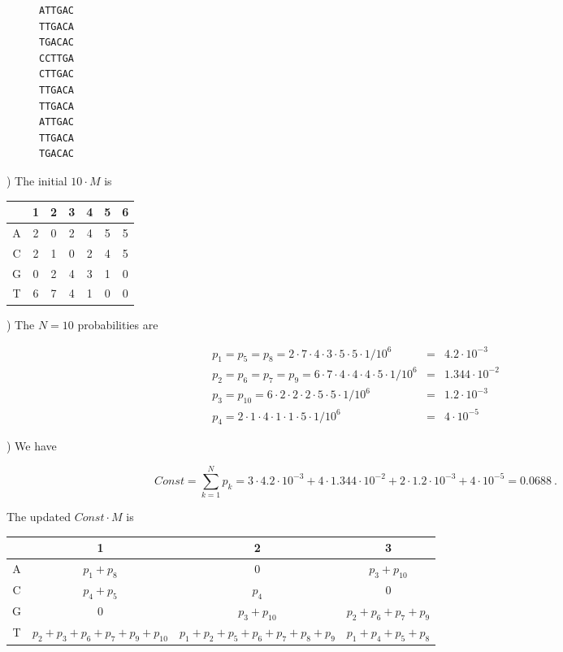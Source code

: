 \documentclass[a4paper,11pt]{article}
\begin{document}
\begin{figure}[h!]
\centering
\begin{BVerbatim}
ATTGAC
TTGACA
TGACAC
CCTTGA
CTTGAC
TTGACA
TTGACA
ATTGAC
TTGACA
TGACAC
\end{BVerbatim}
\end{figure}

\newpage
{}) The initial $10 \cdot M$ is

\begin{table}[h!]
\begin{center}
\begin{tabular}{|c|c|c|c|c|c|c|}
\hline
 & 1 & 2 & 3 & 4 & 5 & 6\\
\hline
A & 2 & 0 & 2 & 4 & 5 & 5\\
\hline
C & 2 & 1 & 0 & 2 & 4 & 5\\
\hline
G & 0 & 2 & 4 & 3 & 1 & 0\\
\hline
T & 6 & 7 & 4 & 1 & 0 & 0\\
 \hline
\end{tabular}
\end{center}
\end{table}

) The $N=10$ probabilities are 

\begin{eqnarray*}
p_1 = p_5 = p_8 = 2 \cdot 7 \cdot 4 \cdot 3 \cdot 5 \cdot 5 \cdot 1/10^6 &=& 4.2 \cdot 10^{-3}\\
p_2 = p_6 = p_7 = p_9 = 6 \cdot 7 \cdot 4 \cdot 4 \cdot 4 \cdot 5 \cdot 1/10^6 &=& 1.344 \cdot 10^{-2}\\
p_3 = p_{10} = 6 \cdot 2 \cdot 2 \cdot 2 \cdot 5 \cdot 5 \cdot 1/10^6 &=& 1.2 \cdot10^{-3}\\
p_4 = 2 \cdot 1 \cdot 4 \cdot 1 \cdot 1 \cdot 5 \cdot 1/10^6 &=& 4 \cdot 10^{-5}
\end{eqnarray*}

) We have 

$$
Const = \sum_{k=1}^N p_k = 3 \cdot 4.2 \cdot 10^{-3} + 4 \cdot 1.344 \cdot 10^{-2} + 2 \cdot 1.2 \cdot10^{-3} + 4 \cdot 10^{-5} = 0.0688~.
$$ 

\noindent The updated $Const \cdot M$ is

\begin{table}[h!]
\begin{center}
\begin{tabular}{|c|c|c|c|}
\hline
 & 1 & 2 & 3 \\
\hline
A & $p_1 + p_8$ & 0 & $p_3 + p_{10}$ \\
\hline
C & $p_4 + p_5$ & $p_4$ & 0  \\
\hline
G & 0 & $p_3 + p_{10}$ & $p_2 + p_6 + p_7 + p_9$ \\
\hline
T & $p_2 + p_3 + p_6 + p_7 + p_9 + p_{10}$ & $p_1 + p_2 + p_5 + p_6 + p_7 + p_8 +p_9$ & $p_1 + p_4 + p_5 + p_8$ \\
 \hline
\end{tabular}
\end{center}
\end{table}
\end{document}
